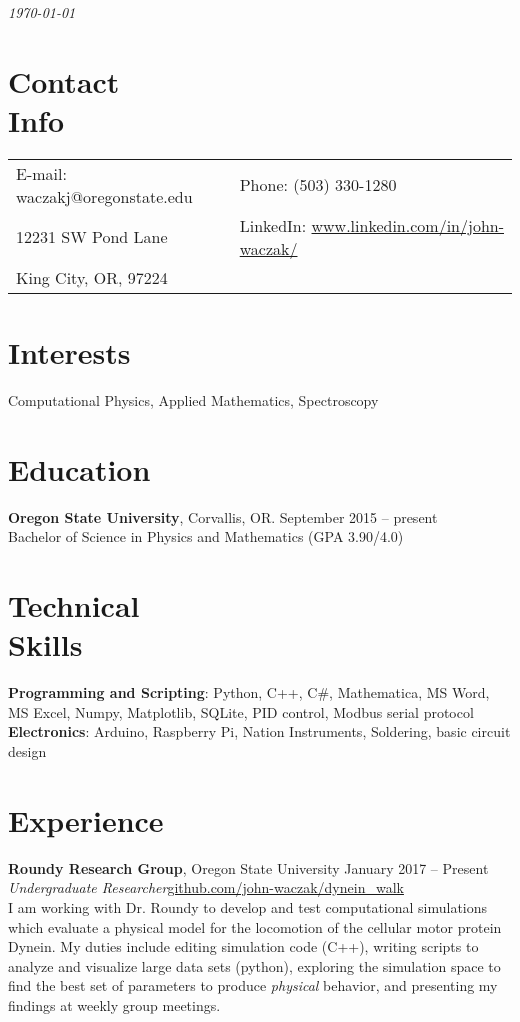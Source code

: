 \documentclass[margin,line, 11pt]{res}
\begin{document}
 \hfill {\em \today}

\begin{resume}
\section{\sc Contact\\ Info}

\vspace{.05in}
\begin{tabular}{@{}p{3.5in}p{3in}}
{E-mail:}  waczakj@oregonstate.edu   & {Phone:}  (503) 330-1280 \\
12231 SW Pond Lane & {LinkedIn:} \scriptsize{ \url{www.linkedin.com/in/john-waczak/}}\\
King City, OR, 97224  
\end{tabular}


\section{\sc Interests}

Computational Physics, Applied Mathematics, Spectroscopy

\section{\sc Education}
{\bf Oregon State University}, Corvallis, OR. \hfill September 2015 -- present\\
Bachelor of Science in Physics and Mathematics \hfill(GPA 3.90/4.0)

\section{\sc Technical \\ Skills}
{\bf Programming and Scripting}: Python, C++, C\#, Mathematica, MS Word, MS Excel, Numpy, Matplotlib, SQLite, PID control, Modbus serial protocol \\
{\bf Electronics}: Arduino, Raspberry Pi, Nation Instruments, Soldering, basic circuit design 
\section{\sc Experience}
{\bf Roundy Research Group}, Oregon State University \hfill{January 2017 -- Present}\\
{\em Undergraduate Researcher}\hfill \scriptsize{\url{github.com/john-waczak/dynein_walk}}\\
I am working with Dr. Roundy to develop and test computational simulations which evaluate a physical model for the locomotion of the cellular motor protein Dynein. My duties include editing simulation code (C++), writing scripts to analyze and visualize large data sets (python), exploring the simulation space to find the best set of parameters to produce \textit{physical} behavior, and presenting my findings at weekly group meetings.


\end{resume}
\end{document}
